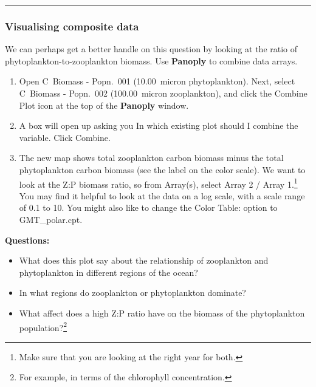 \vspace{1mm}\noindent\rule{4cm}{0.5pt}\vspace{2mm}

\newpage

\subsubsection{Visualising composite data}
\vspace{1mm}

We can perhaps get a better handle on this question by looking at the ratio of phytoplankton-to-zooplankton biomass. Use \textbf{Panoply} to combine data arrays.

\vspace{1mm}
\begin{enumerate}[noitemsep]
\vspace{1mm}
\item Open \textsf{\footnotesize C~Biomass - Popn.~001 (10.00~micron phytoplankton)}. Next, select \textsf{\footnotesize C~Biomass - Popn.~002 (100.00~micron zooplankton)}, and click the \textsf{\footnotesize Combine Plot} icon at the top of the \textbf{Panoply} window.
\vspace{1mm}
\item A box will open up asking you \textsf{\footnotesize In which existing plot should I combine the variable}. Click \textsf{\footnotesize Combine}.
\vspace{1mm}
\item The new map shows total zooplankton carbon biomass minus the total phytoplankton carbon biomass (see the label on the color scale). We want to look at the Z:P biomass ratio, so from \textsf{\footnotesize Array(s)}, select \textsf{\footnotesize Array 2 / Array 1}.\footnote{Make sure that you are looking at the right year for both.} You may find it helpful to look at the data on a log scale, with a scale range of \textsf{\footnotesize 0.1} to \textsf{\footnotesize 10}. You might also like to change the \textsf{\footnotesize Color Table:} option to \textsf{\footnotesize GMT\_polar.cpt}.
\end{enumerate}

\vspace{2mm}
\noindent \textbf{Questions:}
\vspace{1mm}
\begin{itemize}
\item What does this plot say about the relationship of zooplankton and phytoplankton in different regions of the ocean?
\item In what regions do zooplankton or phytoplankton dominate?
\item What affect does a high Z:P ratio have on the biomass of the phytoplankton population?\footnote{For example, in terms of the chlorophyll concentration.}
\end{itemize}

